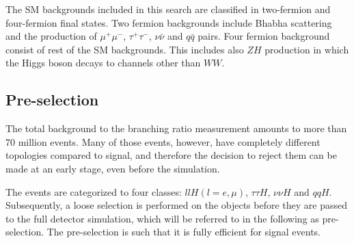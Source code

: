 \documentclass[11pt,a4paper]{cepcnote}
\begin{document}
The SM backgrounds included in this search are classified in two-fermion and four-fermion final states.
Two fermion backgrounds include  Bhabha scattering and the production of $\mu^+\mu^-$, $\tau^+\tau^-$, $\nu\bar{\nu}$ and $q\bar{q}$ pairs.
Four fermion background consist of rest of the SM backgrounds.
This includes also $ZH$ production in which the Higgs boson decays to channels other than $WW$.

\subsection{Pre-selection}
The total background to the branching ratio measurement amounts to more than 70 million events.
Many of those events, however, have completely different topologies compared to signal, and therefore
the decision to reject them can be made at an early stage, even before the simulation.

The events are categorized to four classes: $llH(l=e,\mu)$, $\tau\tau H$, 
$\nu\nu H$ and $qqH$. Subsequently,  a loose selection is performed on the objects
before they are passed to the full detector simulation, which will be referred to in the
following as pre-selection. The pre-selection is such that it is fully efficient for
signal events.
\end{document}
